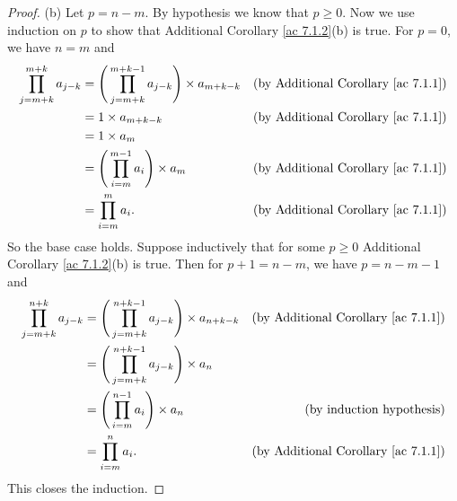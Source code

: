 \begin{proof}{(b)}
    Let \(p = n - m\).
    By hypothesis we know that \(p \geq 0\).
    Now we use induction on \(p\) to show that Additional Corollary \ref{ac 7.1.2}(b) is true.
    For \(p = 0\), we have \(n = m\) and
    \begin{align*}
        \prod_{j = m + k}^{m + k} a_{j - k} & = \Bigg(\prod_{j = m + k}^{m + k - 1} a_{j - k}\Bigg) \times a_{m + k - k} & \text{(by Additional Corollary \ref{ac 7.1.1})} \\
                                            & = 1 \times a_{m + k - k}                                                   & \text{(by Additional Corollary \ref{ac 7.1.1})} \\
                                            & = 1 \times a_m                                                                                                               \\
                                            & = \Bigg(\prod_{i = m}^{m - 1} a_i\Bigg) \times a_m                         & \text{(by Additional Corollary \ref{ac 7.1.1})} \\
                                            & = \prod_{i = m}^m a_i.                                                     & \text{(by Additional Corollary \ref{ac 7.1.1})}
    \end{align*}
    So the base case holds.
    Suppose inductively that for some \(p \geq 0\) Additional Corollary \ref{ac 7.1.2}(b) is true.
    Then for \(p + 1 = n - m\), we have \(p = n - m - 1\) and
    \begin{align*}
        \prod_{j = m + k}^{n + k} a_{j - k} & = \Bigg(\prod_{j = m + k}^{n + k - 1} a_{j - k}\Bigg) \times a_{n + k - k} & \text{(by Additional Corollary \ref{ac 7.1.1})} \\
                                            & = \Bigg(\prod_{j = m + k}^{n + k - 1} a_{j - k}\Bigg) \times a_n                                                             \\
                                            & = \Bigg(\prod_{i = m}^{n - 1} a_i\Bigg) \times a_n                         & \text{(by induction hypothesis)}                \\
                                            & = \prod_{i = m}^n a_i.                                                     & \text{(by Additional Corollary \ref{ac 7.1.1})}
    \end{align*}
    This closes the induction.
\end{proof}

